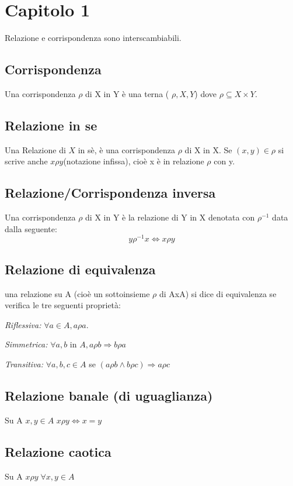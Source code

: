 \section{Capitolo 1}
Relazione e corrispondenza sono interscambiabili.

\subsection{Corrispondenza}
Una corrispondenza \(\rho\) di X in Y è una terna ( \(\rho, X, Y\)) dove \(\rho \subseteq X\times Y\).

\subsection{Relazione in se}
Una Relazione di \(X\) in sè, è una corrispondenza \(\rho\) di X in X.
Se \((x, y) \in\rho\) si scrive anche \(x\rho y\)(notazione infissa), cioè x è in relazione \(\rho\) con y.

\subsection{Relazione/Corrispondenza inversa} 
Una corrispondenza \(\rho\) di X in Y è la relazione di Y in X denotata con \(\rho ^{-1}\) data dalla seguente:
\[y\rho^{-1}x \Leftrightarrow x\rho y\]

\subsection{Relazione di equivalenza} una relazione su A (cioè un sottoinsieme \(\rho\) di AxA) si dice di equivalenza se verifica le tre seguenti proprietà:

\textit{Riflessiva:} \(\forall a \in A, a\rho a\).

\textit{Simmetrica:} \(\forall a,b\) in \(A, a\rho b \Rightarrow b\rho a\)

\textit{Transitiva:} \(\forall a, b, c \in A\) se \((a\rho b \wedge b\rho c) \Rightarrow a\rho c\)

\subsection{Relazione banale (di uguaglianza)} 
Su A \(x, y \in A\) \(x\rho y \Leftrightarrow x=y\)

\subsection{Relazione caotica} 
Su A \(x\rho y\; \forall x,y \in A\)

